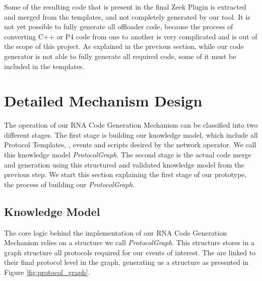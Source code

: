 Some of the resulting code that is present in the final Zeek Plugin is extracted and merged from the templates, and not completely generated by our tool. It is not yet possible to fully generate all offloader code, because the process of converting C++ or P4 code from one to another is very complicated and is out of the scope of this project. As explained in the previous section, while our code generator is not able to fully generate all required code, some of it must be included in the templates.

\section{Detailed Mechanism Design}
\label{sec:code_gen_impl}

The operation of our RNA Code Generation Mechanism can be classified into two different stages. The first stage is building our knowledge model, which include all Protocol Templates, \Offloaders{}, events and scripts desired by the network operator. We call this knowledge model \textit{ProtocolGraph}. The second stage is the actual code merge and generation using this structured and validated knowledge model from the previous step. We start this section explaining the first stage of our prototype, the process of building our \textit{ProtocolGraph}.

\subsection{Knowledge Model}

The core logic behind the implementation of our RNA Code Generation Mechanism relies on a structure we call \textit{ProtocolGraph}. This structure stores in a graph structure all protocols required for our events of interest. The \Offloaders{} are linked to their final protocol level in the graph, generating us a structure as presented in Figure \ref{fig:protocol_graph}.

